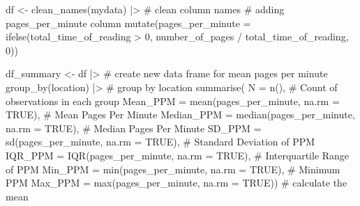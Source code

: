 \documentclass[
  letterpaper,
  DIV=11,
  numbers=noendperiod]{scrartcl}
\newenvironment{Shaded}{\begin{snugshade}}{\end{snugshade}}
\newcommand{\AttributeTok}[1]{\textcolor[rgb]{0.40,0.45,0.13}{#1}}
\newcommand{\CommentTok}[1]{\textcolor[rgb]{0.37,0.37,0.37}{#1}}
\newcommand{\ConstantTok}[1]{\textcolor[rgb]{0.56,0.35,0.01}{#1}}
\newcommand{\DecValTok}[1]{\textcolor[rgb]{0.68,0.00,0.00}{#1}}
\newcommand{\FunctionTok}[1]{\textcolor[rgb]{0.28,0.35,0.67}{#1}}
\newcommand{\NormalTok}[1]{\textcolor[rgb]{0.00,0.23,0.31}{#1}}
\newcommand{\OtherTok}[1]{\textcolor[rgb]{0.00,0.23,0.31}{#1}}
\newcommand{\SpecialCharTok}[1]{\textcolor[rgb]{0.37,0.37,0.37}{#1}}
\begin{document}
\begin{Shaded}
\begin{Highlighting}[]
\NormalTok{df }\OtherTok{\textless{}{-}} \FunctionTok{clean\_names}\NormalTok{(mydata) }\SpecialCharTok{|\textgreater{}} \CommentTok{\# clean column names}
  \CommentTok{\# adding pages\_per\_minute column}
  \FunctionTok{mutate}\NormalTok{(}\AttributeTok{pages\_per\_minute =} \FunctionTok{ifelse}\NormalTok{(total\_time\_of\_reading }\SpecialCharTok{\textgreater{}} \DecValTok{0}\NormalTok{,  number\_of\_pages }\SpecialCharTok{/}\NormalTok{ total\_time\_of\_reading, }\DecValTok{0}\NormalTok{))}

\NormalTok{df\_summary }\OtherTok{\textless{}{-}}\NormalTok{ df }\SpecialCharTok{|\textgreater{}} \CommentTok{\# create new data frame for mean pages per minute}
  \FunctionTok{group\_by}\NormalTok{(location) }\SpecialCharTok{|\textgreater{}} \CommentTok{\# group by location}
  \FunctionTok{summarise}\NormalTok{(}
    \AttributeTok{N =} \FunctionTok{n}\NormalTok{(),                               }\CommentTok{\# Count of observations in each group}
    \AttributeTok{Mean\_PPM =} \FunctionTok{mean}\NormalTok{(pages\_per\_minute, }\AttributeTok{na.rm =} \ConstantTok{TRUE}\NormalTok{),    }\CommentTok{\# Mean Pages Per Minute}
    \AttributeTok{Median\_PPM =} \FunctionTok{median}\NormalTok{(pages\_per\_minute, }\AttributeTok{na.rm =} \ConstantTok{TRUE}\NormalTok{), }\CommentTok{\# Median Pages Per Minute}
    \AttributeTok{SD\_PPM =} \FunctionTok{sd}\NormalTok{(pages\_per\_minute, }\AttributeTok{na.rm =} \ConstantTok{TRUE}\NormalTok{),        }\CommentTok{\# Standard Deviation of PPM}
    \AttributeTok{IQR\_PPM =} \FunctionTok{IQR}\NormalTok{(pages\_per\_minute, }\AttributeTok{na.rm =} \ConstantTok{TRUE}\NormalTok{),      }\CommentTok{\# Interquartile Range of PPM}
    \AttributeTok{Min\_PPM =} \FunctionTok{min}\NormalTok{(pages\_per\_minute, }\AttributeTok{na.rm =} \ConstantTok{TRUE}\NormalTok{),      }\CommentTok{\# Minimum PPM}
    \AttributeTok{Max\_PPM =} \FunctionTok{max}\NormalTok{(pages\_per\_minute, }\AttributeTok{na.rm =} \ConstantTok{TRUE}\NormalTok{)) }\CommentTok{\# calculate the mean}


\end{Highlighting}
\end{Shaded}
\end{document}

